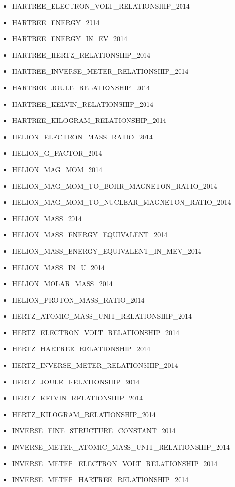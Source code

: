 \begin{itemize}
  HARTREE\_ATOMIC\_MASS\_UNIT\_RELATIONSHIP\_2014
\item
  HARTREE\_ELECTRON\_VOLT\_RELATIONSHIP\_2014
\item
  HARTREE\_ENERGY\_2014
\item
  HARTREE\_ENERGY\_IN\_EV\_2014
\item
  HARTREE\_HERTZ\_RELATIONSHIP\_2014
\item
  HARTREE\_INVERSE\_METER\_RELATIONSHIP\_2014
\item
  HARTREE\_JOULE\_RELATIONSHIP\_2014
\item
  HARTREE\_KELVIN\_RELATIONSHIP\_2014
\item
  HARTREE\_KILOGRAM\_RELATIONSHIP\_2014
\item
  HELION\_ELECTRON\_MASS\_RATIO\_2014
\item
  HELION\_G\_FACTOR\_2014
\item
  HELION\_MAG\_MOM\_2014
\item
  HELION\_MAG\_MOM\_TO\_BOHR\_MAGNETON\_RATIO\_2014
\item
  HELION\_MAG\_MOM\_TO\_NUCLEAR\_MAGNETON\_RATIO\_2014
\item
  HELION\_MASS\_2014
\item
  HELION\_MASS\_ENERGY\_EQUIVALENT\_2014
\item
  HELION\_MASS\_ENERGY\_EQUIVALENT\_IN\_MEV\_2014
\item
  HELION\_MASS\_IN\_U\_2014
\item
  HELION\_MOLAR\_MASS\_2014
\item
  HELION\_PROTON\_MASS\_RATIO\_2014
\item
  HERTZ\_ATOMIC\_MASS\_UNIT\_RELATIONSHIP\_2014
\item
  HERTZ\_ELECTRON\_VOLT\_RELATIONSHIP\_2014
\item
  HERTZ\_HARTREE\_RELATIONSHIP\_2014
\item
  HERTZ\_INVERSE\_METER\_RELATIONSHIP\_2014
\item
  HERTZ\_JOULE\_RELATIONSHIP\_2014
\item
  HERTZ\_KELVIN\_RELATIONSHIP\_2014
\item
  HERTZ\_KILOGRAM\_RELATIONSHIP\_2014
\item
  INVERSE\_FINE\_STRUCTURE\_CONSTANT\_2014
\item
  INVERSE\_METER\_ATOMIC\_MASS\_UNIT\_RELATIONSHIP\_2014
\item
  INVERSE\_METER\_ELECTRON\_VOLT\_RELATIONSHIP\_2014
\item
  INVERSE\_METER\_HARTREE\_RELATIONSHIP\_2014

\end{itemize}
